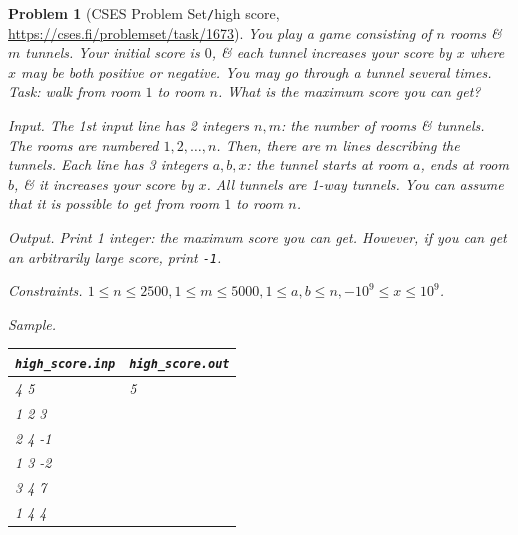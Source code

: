 \documentclass[oneside]{book}
\newtheorem{problem}{Problem}
\begin{document}
\begin{problem}[CSES Problem Set{\tt/}high score, \url{https://cses.fi/problemset/task/1673}]
	You play a game consisting of $n$ rooms \& $m$ tunnels. Your initial score is $0$, \& each tunnel increases your score by $x$ where $x$ may be both positive or negative. You may go through a tunnel several times. Task: walk from room $1$ to room $n$. What is the maximum score you can get?
	\item {\sf Input.} The 1st input line has 2 integers $n,m$: the number of rooms \& tunnels. The rooms are numbered $1,2,\ldots,n$. Then, there are $m$ lines describing the tunnels. Each line has 3 integers $a,b,x$: the tunnel starts at room $a$, ends at room $b$, \& it increases your score by $x$. All tunnels are 1-way tunnels. You can assume that it is possible to get from room $1$ to room $n$.
	\item {\sf Output.} Print 1 integer: the maximum score you can get. However, if you can get an arbitrarily large score, print {\tt-1}.
	\item {\sf Constraints.} $1\le n\le2500,1\le m\le5000,1\le a,b\le n,-10^9\le x\le10^9$.
	\item {\sf Sample.}
	\begin{table}[H]
		\centering
		\begin{tabular}{|l|l|}
			\hline
			\verb|high_score.inp| & \verb|high_score.out| \\
			\hline
			4 5 & 5 \\
			1 2 3 & \\
			2 4 -1 & \\
			1 3 -2 & \\
			3 4 7 & \\
			1 4 4 & \\
			\hline
		\end{tabular}
	\end{table}
\end{problem}
\end{document}
